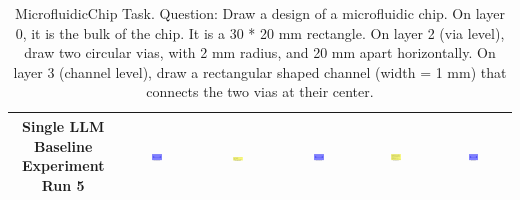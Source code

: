 \begin{table}[H]
\begin{tabular}{|c|c|c|c|c|c|}
    \hline
    Single LLM Baseline Experiment Run 5 & \includegraphics[width=0.15\textwidth]{./run_5/png/gpt-4o_results/MicrofluidicChip.png} & \includegraphics[width=0.15\textwidth]{./run_5/png/claude-3-5-sonnet-20240620_results/MicrofluidicChip.png} & \includegraphics[width=0.15\textwidth]{./run_5/png/watsonx_meta-llama_llama-3-1-70b-instruct_results/MicrofluidicChip.png} & \includegraphics[width=0.15\textwidth]{./run_5/png/watsonx_meta-llama_llama-3-405b-instruct_results/MicrofluidicChip.png} & \includegraphics[width=0.15\textwidth]{./run_5/png/o1-preview_results/MicrofluidicChip.png} \\
    \hline
    \end{tabular}
    \caption{MicrofluidicChip Task. Question: Draw a design of a microfluidic chip. On layer 0, it is the bulk of the chip. It is a 30 * 20 mm rectangle. On layer 2 (via level), draw two circular vias, with 2 mm radius, and 20 mm apart horizontally. On layer 3 (channel level), draw a rectangular shaped channel (width = 1 mm) that connects the two vias at their center.}
\end{table}

